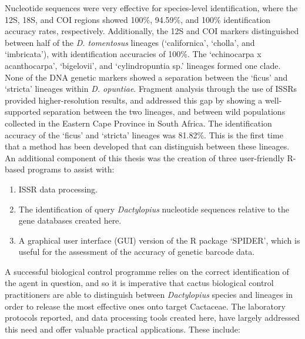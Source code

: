 Nucleotide sequences were very effective for species-level identification, where the 12S, 18S, and COI regions showed 100\%, 94.59\%, and 100\% identification accuracy rates, respectively. Additionally, the 12S and COI markers distinguished between half of the \textit{D. tomentosus} lineages (`californica', `cholla', and `imbricata'), with identification accuracies of 100\%. The `echinocarpa x acanthocarpa', `bigelovii', and `cylindropuntia sp.' lineages formed one clade. 
None of the DNA genetic markers showed a separation between the `ficus' and `stricta' lineages within \textit{D. opuntiae}. Fragment analysis through the use of ISSRs provided higher-resolution results, and addressed this gap by showing a well-supported separation between the two lineages, and between wild populations collected in the Eastern Cape Province in South Africa. The identification accuracy of the `ficus' and `stricta' lineages was 81.82\%. This is the first time that a method has been developed that can distinguish between these lineages. 
An additional component of this thesis was the creation of three user-friendly R-based programs to assist with:
\begin{enumerate}
    \item ISSR data processing.
    \item The identification of query \textit{Dactylopius} nucleotide sequences relative to the gene databases created here.
    \item A graphical user interface (GUI) version of the R package `SPIDER', which is useful for the assessment of the accuracy of genetic barcode data.
\end{enumerate}
A successful biological control programme relies on the correct identification of the agent in question, and so it is imperative that cactus biological control practitioners are able to distinguish between \textit{Dactylopius} species and lineages in order to release the most effective ones onto target Cactaceae.
The laboratory protocols reported, and data processing tools created here, have largely addressed this need and offer valuable practical applications. These include: 
